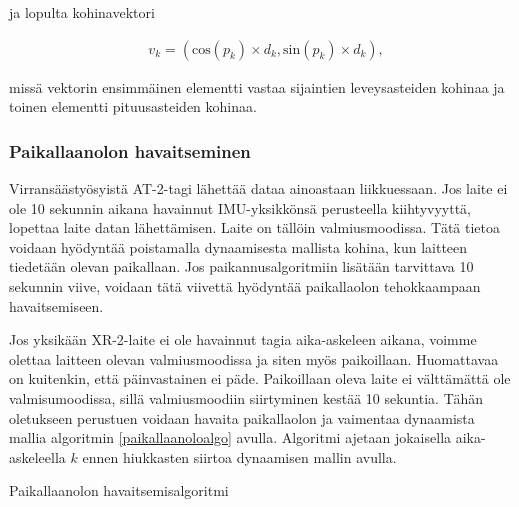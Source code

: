 \documentclass[
  12pt,
  a4paper, twoside]{book}
\begin{document}
ja lopulta kohinavektori

\begin{align}
&v_k = (\text{cos}(p_k) \times d_k, \text{sin}(p_k) \times d_k),
\end{align}

missä vektorin ensimmäinen elementti vastaa sijaintien leveysasteiden kohinaa ja toinen elementti pituusasteiden kohinaa.

\hypertarget{paikallaanolon-havaitseminen}{%
\subsubsection{Paikallaanolon havaitseminen}\label{paikallaanolon-havaitseminen}}

Virransäästyösyistä AT-2-tagi lähettää dataa ainoastaan liikkuessaan. Jos laite ei ole 10 sekunnin aikana havainnut IMU-yksikkönsä perusteella kiihtyvyyttä, lopettaa laite datan lähettämisen. Laite on tällöin valmiusmoodissa. Tätä tietoa voidaan hyödyntää poistamalla dynaamisesta mallista kohina, kun laitteen tiedetään olevan paikallaan. Jos paikannusalgoritmiin lisätään tarvittava 10 sekunnin viive, voidaan tätä viivettä hyödyntää paikallaolon tehokkaampaan havaitsemiseen.

Jos yksikään XR-2-laite ei ole havainnut tagia aika-askeleen aikana, voimme olettaa laitteen olevan valmiusmoodissa ja siten myös paikoillaan. Huomattavaa on kuitenkin, että päinvastainen ei päde. Paikoillaan oleva laite ei välttämättä ole valmisumoodissa, sillä valmiusmoodiin siirtyminen kestää 10 sekuntia. Tähän oletukseen perustuen voidaan havaita paikallaolon ja vaimentaa dynaamista mallia algoritmin \ref{paikallaanoloalgo} avulla. Algoritmi ajetaan jokaisella aika-askeleella \(k\) ennen hiukkasten siirtoa dynaamisen mallin avulla.

\begin{algorithm}[H]
\label{paikallaanoloalgo}
\DontPrintSemicolon
\SetAlgoShortEnd
{}
\caption{Paikallaanolon havaitsemisalgoritmi}
\end{algorithm}
\end{document}
